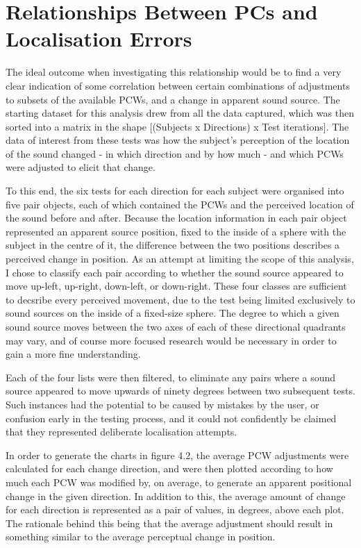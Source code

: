 \section{Relationships Between PCs and Localisation Errors}
The ideal outcome when investigating this relationship would be to find a very clear indication of some correlation between certain combinations of adjustments to subsets of the available PCWs, and a change in apparent sound source. The starting dataset for this analysis drew from all the data captured, which was then sorted into a matrix in the shape [(Subjects x Directions) x Test iterations]. The data of interest from these tests was how the subject's perception of the location of the sound changed - in which direction and by how much - and which PCWs were adjusted to elicit that change. 

To this end, the six tests for each direction for each subject were organised into five pair objects, each of which contained the PCWs and the perceived location of the sound before and after. Because the location information in each pair object represented an apparent source position, fixed to the inside of a sphere with the subject in the centre of it, the difference between the two positions describes a perceived change in position. As an attempt at limiting the scope of this analysis, I chose to classify each pair according to whether the sound source appeared to move up-left, up-right, down-left, or down-right. These four classes are sufficient to decsribe every perceived movement, due to the test being limited exclusively to sound sources on the inside of a fixed-size sphere. The degree to which a given sound source moves between the two axes of each of these directional quadrants may vary, and of course more focused research would be necessary in order to gain a more fine understanding.

Each of the four lists were then filtered, to eliminate any pairs where a sound source appeared to move upwards of ninety degrees between two subsequent tests. Such instances had the potential to be caused by mistakes by the user, or confusion early in the testing process, and it could not confidently be claimed that they represented deliberate localisation attempts. 

In order to generate the charts in figure 4.2, the average PCW adjustments were calculated for each change direction, and were then plotted according to how much each PCW was modified by, on average, to generate an apparent positional change in the given direction. In addition to this, the average amount of change for each direction is represented as a pair of values, in degrees, above each plot. The rationale behind this being that the average adjustment should result in something similar to the average perceptual change in position.

